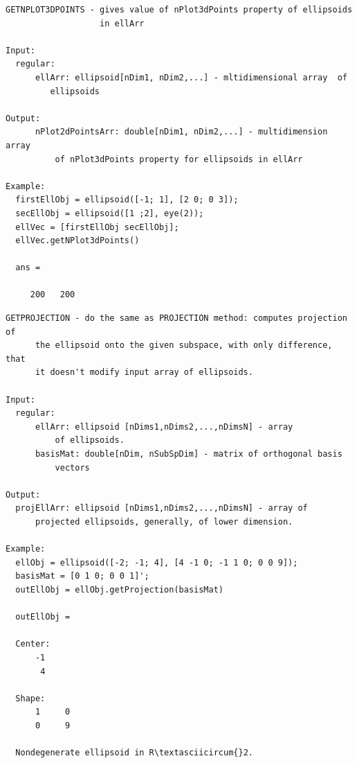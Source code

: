 \documentclass[letterpaper,10pt,english]{sphinxmanual}
\begin{document}
\begin{Verbatim}[commandchars=\\\{\}]
GETNPLOT3DPOINTS - gives value of nPlot3dPoints property of ellipsoids
                   in ellArr

Input:
  regular:
      ellArr: ellipsoid[nDim1, nDim2,...] - mltidimensional array  of
         ellipsoids

Output:
      nPlot2dPointsArr: double[nDim1, nDim2,...] - multidimension array
          of nPlot3dPoints property for ellipsoids in ellArr

Example:
  firstEllObj = ellipsoid([-1; 1], [2 0; 0 3]);
  secEllObj = ellipsoid([1 ;2], eye(2));
  ellVec = [firstEllObj secEllObj];
  ellVec.getNPlot3dPoints()

  ans =

     200   200
\end{Verbatim}

\begin{Verbatim}[commandchars=\\\{\}]
GETPROJECTION - do the same as PROJECTION method: computes projection of
      the ellipsoid onto the given subspace, with only difference, that
      it doesn't modify input array of ellipsoids.

Input:
  regular:
      ellArr: ellipsoid [nDims1,nDims2,...,nDimsN] - array
          of ellipsoids.
      basisMat: double[nDim, nSubSpDim] - matrix of orthogonal basis
          vectors

Output:
  projEllArr: ellipsoid [nDims1,nDims2,...,nDimsN] - array of
      projected ellipsoids, generally, of lower dimension.

Example:
  ellObj = ellipsoid([-2; -1; 4], [4 -1 0; -1 1 0; 0 0 9]);
  basisMat = [0 1 0; 0 0 1]';
  outEllObj = ellObj.getProjection(basisMat)

  outEllObj =

  Center:
      -1
       4

  Shape:
      1     0
      0     9

  Nondegenerate ellipsoid in R\textasciicircum{}2.
\end{Verbatim}
\end{document}
